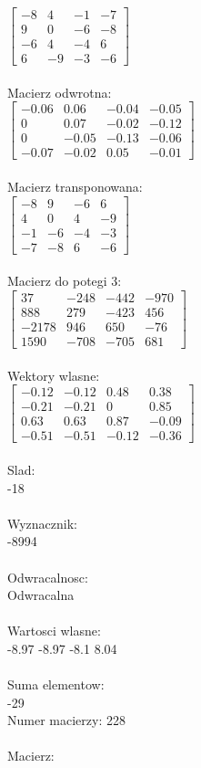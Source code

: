 \documentclass[a4paper,12pt]{article}
\begin{document}
$\begin{bmatrix} -8&4&-1&-7\\9&0&-6&-8\\-6&4&-4&6\\6&-9&-3&-6 \end{bmatrix}$
\\
\\
Macierz odwrotna:\\

$\begin{bmatrix} -0.06&0.06&-0.04&-0.05\\0&0.07&-0.02&-0.12\\0&-0.05&-0.13&-0.06\\-0.07&-0.02&0.05&-0.01 \end{bmatrix}$
\\
\\
Macierz transponowana:\\

$\begin{bmatrix} -8&9&-6&6\\4&0&4&-9\\-1&-6&-4&-3\\-7&-8&6&-6 \end{bmatrix}$
\\
\\
Macierz do potegi 3:\\

$\begin{bmatrix} 37&-248&-442&-970\\888&279&-423&456\\-2178&946&650&-76\\1590&-708&-705&681 \end{bmatrix}$
\\
\\
Wektory wlasne:\\

$\begin{bmatrix} -0.12&-0.12&0.48&0.38\\-0.21&-0.21&0&0.85\\0.63&0.63&0.87&-0.09\\-0.51&-0.51&-0.12&-0.36 \end{bmatrix}$
\\
\\
Slad:\\
-18
\\
\\
Wyznacznik:\\
-8994
\\
\\
Odwracalnosc:\\
Odwracalna
\\
\\
Wartosci wlasne:\\
-8.97 -8.97 -8.1 8.04
\\
\\
Suma elementow:\\
-29
\\
\newpage
Numer macierzy:
228
\\
\\
Macierz:\\
\end{document}
